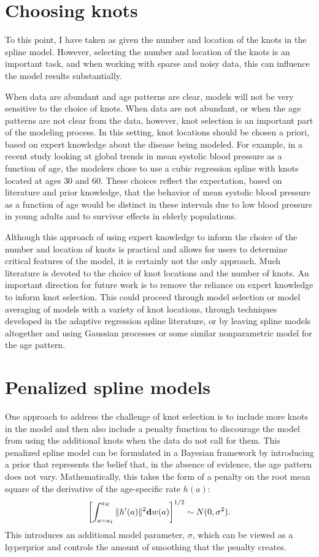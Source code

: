 \section{Choosing knots}

To this point, I have taken as given the number and location of the
knots in the spline model. However, selecting the number and location
of the knots is an important task, and when working with sparse and
noisy data, this can influence the model results
substantially.

When data are abundant and age patterns are clear, models will not be
very sensitive to the choice of knots.  When data are not abundant, or
when the age patterns are not clear from the data, however, knot
selection is an important part of the modeling process.  In this
setting, knot locations should be chosen a priori, based on expert
knowledge about the disease being modeled. For example, in a recent
study looking at global trends in mean systolic blood pressure as a
function of age, the modelers chose to use a cubic regression spline
with knots located at ages $30$ and $60$.\cite{danaei_national_2011} These
choices reflect the expectation, based on literature and prior
knowledge, that the behavior of mean systolic blood pressure as a
function of age would be distinct in these intervals due to low blood
pressure in young adults and to survivor effects in elderly populations.

Although this approach of using expert knowledge to inform the choice of the number
and location of knots is practical and allows for users to
determine critical features of the model, it is certainly not the only
approach. Much literature is devoted to the choice of knot locations
and the number of knots.
An important direction for future work is to remove the reliance on
expert knowledge to inform knot selection.  This could proceed
through model selection or model averaging of models with a variety of
knot locations, \cite{raftery_bayesian_1997} through
techniques developed in the adaptive regression spline literature,
\cite{friedman_multivariate_1991} or by leaving spline models altogether and using Gaussian
processes or some similar nonparametric model for the age pattern.
\cite{rasmussen_gaussian_2006,diggle_model-based_2010}

\section{Penalized spline models}
One approach to address the challenge of knot selection is to include
more knots in the model and then also include a penalty function to
discourage the model from using the additional knots when the data
do not call for them.  This penalized spline model can be formulated in a
Bayesian framework by introducing a prior that represents the belief that, in
the absence of evidence, the age pattern does not vary.
Mathematically, this takes the form of a penalty on the root mean
square of the derivative of the age-specific rate $h(a)$:
\[
\left[\int _{a=a_1} ^{a_K} \| h'(a) \|^2 \mathbf{d} w(a)\right]^{1/2} \sim N(0, \sigma^2).
\]
This introduces an additional model parameter, $\sigma$, which can be
viewed as a hyperprior and controls the amount of smoothing that the
penalty creates.

